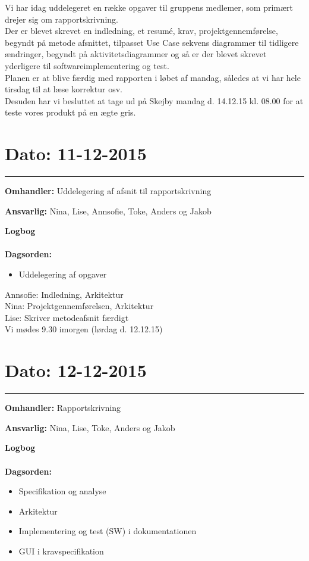 Vi har idag uddelegeret en række opgaver til gruppens medlemer, som primært drejer sig om rapportskrivning. \\
Der er blevet skrevet en indledning, et resumé, krav, projektgennemførelse, begyndt på metode afsnittet, tilpasset Use Case sekvens diagrammer til tidligere ændringer, begyndt på aktivitetsdiagrammer og så er der blevet skrevet yderligere til softwareimplementering og test.\\
Planen er at blive færdig med rapporten i løbet af mandag, således at vi har hele tirsdag til at læse korrektur osv.\\
Desuden har vi besluttet at tage ud på Skejby mandag d. 14.12.15 kl. 08.00 for at teste vores produkt på en ægte gris. 


	
	
\section{Dato: 11-12-2015 }
\hrule

\textbf{Omhandler:} Uddelegering af afsnit til rapportskrivning

\textbf{Ansvarlig:} Nina, Lise, Annsofie, Toke, Anders og Jakob

\textbf{Logbog}
\\
\\
\textbf{Dagsorden:}
\begin{itemize}
	\item Uddelegering af opgaver
\end{itemize}

Annsofie: Indledning, Arkitektur\\
Nina: Projektgennemførelsen, Arkitektur\\
Lise: Skriver metodeafsnit færdigt\\
Vi mødes 9.30 imorgen (lørdag d. 12.12.15)\\


	
	
\section{Dato: 12-12-2015 }
\hrule

\textbf{Omhandler:} Rapportskrivning

\textbf{Ansvarlig:} Nina, Lise, Toke, Anders og Jakob

\textbf{Logbog}
\\
\\
\textbf{Dagsorden:}
\begin{itemize}
	\item Specifikation og analyse
	\item Arkitektur
	\item Implementering og test (SW) i dokumentationen
	\item GUI i kravspecifikation
\end{itemize}

